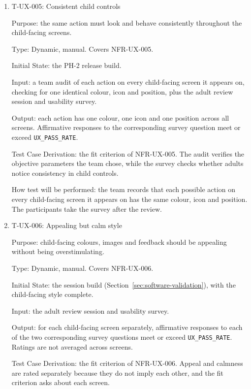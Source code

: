 \documentclass[12pt, titlepage]{article}
\newcommand{\testitem}[1]{\item #1\par\nopagebreak}
\begin{document}
\begin{enumerate}
How test will be performed: for each message, the team records whether it has
an encouraging cue from the approved list, begins with an acknowledgement of
effort, refers to the drawing and not the child, avoids error styling, marks any
missed part by more than colour and uses none of the four words, and records its
word count when spoken. The participants take the survey after the review.

\testitem{T-UX-005: Consistent child controls}

Purpose: the same action must look and behave consistently throughout the
child-facing screens.

Type: Dynamic, manual. Covers NFR-UX-005.

Initial State: the PH-2 release build.

Input: a team audit of each action on every child-facing screen it appears on,
checking for one identical colour, icon and position, plus the adult review
session and usability survey.

Output: each action has one colour, one icon and one position across all
screens. Affirmative responses to the corresponding survey question meet or
exceed \texttt{UX\_PASS\_RATE}.

Test Case Derivation: the fit criterion of NFR-UX-005. The audit verifies the
objective parameters the team chose, while the survey checks whether adults
notice consistency in child controls.

How test will be performed: the team records that each possible action 
on every child-facing screen it appears on has the same colour, icon and
position. The participants take the survey after the review.

\testitem{T-UX-006: Appealing but calm style}

Purpose: child-facing colours, images and feedback should be appealing
without being overstimulating.

Type: Dynamic, manual. Covers NFR-UX-006.

Initial State: the session build (Section~\ref{sec:software-validation}), with
the child-facing style complete.

Input: the adult review session and usability survey.

Output: for each child-facing screen separately, affirmative responses to each
of the two corresponding survey questions meet or exceed \texttt{UX\_PASS\_RATE}.
Ratings are not averaged across screens.

Test Case Derivation: the fit criterion of NFR-UX-006. Appeal and calmness
are rated separately because they do not imply each other, and the fit criterion
asks about each screen.


\end{enumerate}
\end{document}
